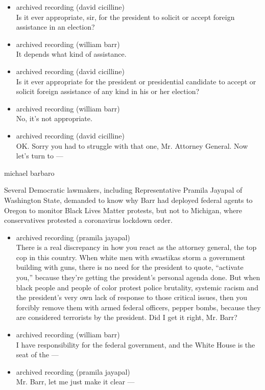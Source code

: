 \begin{itemize}
\item
  archived recording (david cicilline)\\
  Is it ever appropriate, sir, for the president to solicit or accept
  foreign assistance in an election?
\item
  archived recording (william barr)\\
  It depends what kind of assistance.
\item
  archived recording (david cicilline)\\
  Is it ever appropriate for the president or presidential candidate to
  accept or solicit foreign assistance of any kind in his or her
  election?
\item
  archived recording (william barr)\\
  No, it's not appropriate.
\item
  archived recording (david cicilline)\\
  OK. Sorry you had to struggle with that one, Mr. Attorney General. Now
  let's turn to ---
\end{itemize}

michael barbaro

Several Democratic lawmakers, including Representative Pramila Jayapal
of Washington State, demanded to know why Barr had deployed federal
agents to Oregon to monitor Black Lives Matter protests, but not to
Michigan, where conservatives protested a coronavirus lockdown order.

\begin{itemize}
\item
  archived recording (pramila jayapal)\\
  There is a real discrepancy in how you react as the attorney general,
  the top cop in this country. When white men with swastikas storm a
  government building with guns, there is no need for the president to
  quote, ``activate you,'' because they're getting the president's
  personal agenda done. But when black people and people of color
  protest police brutality, systemic racism and the president's very own
  lack of response to those critical issues, then you forcibly remove
  them with armed federal officers, pepper bombs, because they are
  considered terrorists by the president. Did I get it right, Mr. Barr?
\item
  archived recording (william barr)\\
  I have responsibility for the federal government, and the White House
  is the seat of the ---
\item
  archived recording (pramila jayapal)\\
  Mr. Barr, let me just make it clear ---
\end{itemize}

